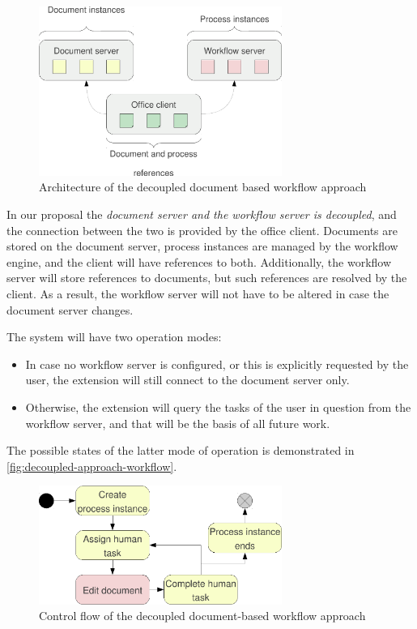 \begin{figure}[H]
\centering
\includegraphics[width=300px,keepaspectratio]{decoupled-approach.pdf}
\caption{Architecture of the decoupled document based workflow approach}
\label{fig:decoupled-approach}
\end{figure}

In our proposal the \emph{document server and the workflow server is
decoupled}, and the connection between the two is provided by the office
client. Documents are stored on the document server, process instances are
managed by the workflow engine, and the client will have references to both.
Additionally, the workflow server will store references to documents, but such
references are resolved by the client. As a result, the workflow server will
not have to be altered in case the document server changes.

The system will have two operation modes:

\begin{itemize}
\item In case no workflow server is configured, or this is explicitly requested
by the user, the extension will still connect to the document server only.
\item Otherwise, the extension will query the tasks of the user in question
from the workflow server, and that will be the basis of all future work.
\end{itemize}

The possible states of the latter mode of operation is demonstrated in
\autoref{fig:decoupled-approach-workflow}.

\begin{figure}[H]
\centering
\includegraphics[width=300px,keepaspectratio]{decoupled-approach-workflow.pdf}
\caption{Control flow of the decoupled document-based workflow approach}
\label{fig:decoupled-approach-workflow}
\end{figure}

